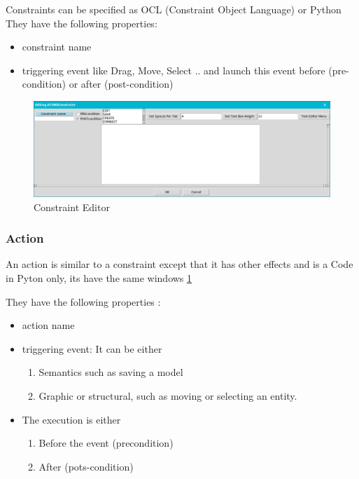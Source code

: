 Constraints can be specified as OCL (Constraint Object Language) or Python
They have the following properties: 
\begin{itemize}
\newcommand{\localtextbulletone}{\textcolor{gray}{\raisebox{.45ex}{\rule{.6ex}{.6ex}}}}
\renewcommand{\labelitemi}{\localtextbulletone}
\item  constraint name
\item  triggering event  like Drag, Move, Select ..
and launch this event before (pre-condition) or after (post-condition)
 
\end{itemize}
 

\begin{figure}[th]
	\centering
	\includegraphics[scale=0.37]{ch3/img/const}
	\caption{\label{fig:Constraint Editor}Constraint Editor}
\end{figure} 

\subsubsection{Action}

An action is similar to a constraint except that it has other effects and is a
Code in Pyton only, its have the same windows \ref{fig:Constraint Editor} 

They have the following properties :
\begin{itemize}
\newcommand{\localtextbulletone}{\textcolor{gray}{\raisebox{.45ex}{\rule{.6ex}{.6ex}}}}
\renewcommand{\labelitemi}{\localtextbulletone}
\item action name
\item triggering event: It can be either
	\begin{enumerate}
	\item Semantics such as saving a model
	\item Graphic or structural, such as moving or selecting an entity.
	\end{enumerate}
	
\item The execution is either
	\begin{enumerate}
	\item Before the event (precondition)
	\item After (pots-condition) 
	\end{enumerate}

\end{itemize}
 


